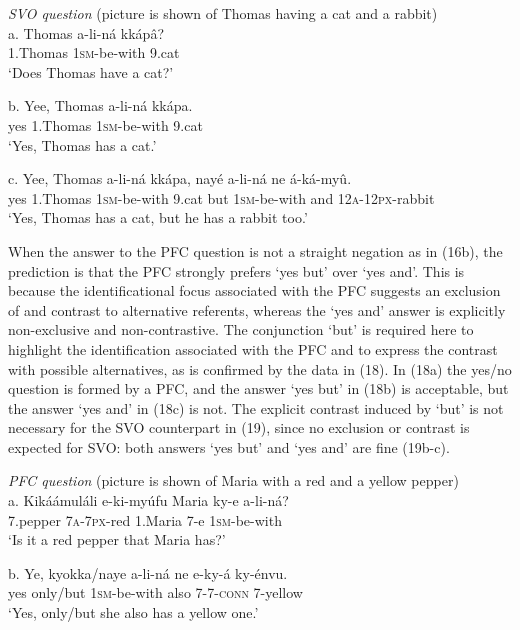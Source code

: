 \documentclass[output=paper]{langsci/langscibook}
\begin{document}
\ea
{\textit{SVO question}}
       (picture is shown of Thomas having a cat and a rabbit)\\
\gll a.  Thomas  a-li-ná  kkápâ?\\
       1.Thomas  \textsc{1sm}-be-with  9.cat\\
\glt   ‘Does Thomas have a cat?’
\z

\ea
\gll b.  Yee,   Thomas  a-li-ná  kkápa.\\
       yes  1.Thomas  \textsc{1sm}-be-with  9.cat\\
\glt   ‘Yes, Thomas has a cat.’
\z

\ea
\gll   c.   Yee,  Thomas    a-li-ná    kkápa,  nayé  a-li-ná    ne  á-ká-myû.\\
       yes  1.Thomas  \textsc{1sm}-be-with  9.cat   but    \textsc{1sm}-be-with  and  \textsc{12a}-\textsc{12px}-rabbit\\
\glt   ‘Yes, Thomas has a cat, but he has a rabbit too.’
\z

When the answer to the PFC question is not a straight negation as in (16b), the prediction is that the PFC strongly prefers ‘yes but’ over ‘yes and’. This is because the identificational focus associated with the PFC suggests an exclusion of and contrast to alternative referents, whereas the ‘yes and’ answer is explicitly non-exclusive and non-contrastive. The conjunction ‘but’ is required here to highlight the identification associated with the PFC and to express the contrast with possible alternatives, as is confirmed by the data in (18). In (18a) the yes/no question is formed by a PFC, and the answer ‘yes but’ in (18b) is acceptable, but the answer ‘yes and’ in (18c) is not. The explicit contrast induced by ‘but’ is not necessary for the SVO counterpart in (19), since no exclusion or contrast is expected for SVO: both answers ‘yes but’ and ‘yes and’ are fine (19b-c).

\ea
{\textit{PFC question}}
     (picture is shown of Maria with a red and a yellow pepper)\\
\gll   a.  Kikáámuláli  e-ki-myúfu  Maria    ky-e  a-li-ná?\\
         7.pepper  \textsc{7a}-\textsc{7px}-red  1.Maria  7-e  \textsc{1sm}-be-with\\
\glt     ‘Is it a red pepper that Maria has?’
\z

\ea
\gll   b.  Ye,  kyokka/naye  a-li-ná  ne  e-ky-á    ky-énvu.\\
         yes  only/but  \textsc{1sm}-be-with  also  \textsc{7}-\textsc{7}-\textsc{conn}  7-yellow\\
\glt     ‘Yes, only/but she also has a yellow one.’
\z
\end{document}
